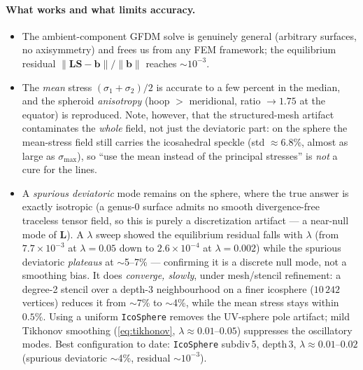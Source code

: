 \documentclass[11pt]{article}
\newcommand{\vv}[1]{\bm{#1}}
\begin{document}
\paragraph{What works and what limits accuracy.}
\begin{itemize}[noitemsep]
  \item The ambient-component GFDM solve is genuinely general (arbitrary surfaces, no
        axisymmetry) and frees us from any FEM framework; the equilibrium residual
        $\|\mathbf L\vv S-\vv b\|/\|\vv b\|$ reaches $\sim\!10^{-3}$.
  \item The \emph{mean} stress $(\sigma_1+\sigma_2)/2$ is accurate to a few percent in the
        median, and the spheroid \emph{anisotropy} (hoop $>$ meridional, ratio $\to1.75$ at
        the equator) is reproduced. Note, however, that the structured-mesh artifact
        contaminates the \emph{whole} field, not just the deviatoric part: on the sphere the
        mean-stress field still carries the icosahedral speckle (std $\approx6.8\%$, almost
        as large as $\sigma_{\max}$), so ``use the mean instead of the principal stresses''
        is \emph{not} a cure for the lines.
  \item A \emph{spurious deviatoric} mode remains on the sphere, where the true answer is
        exactly isotropic (a genus-0 surface admits no smooth divergence-free traceless
        tensor field, so this is purely a discretization artifact --- a near-null mode of
        $\mathbf L$). A $\lambda$ sweep showed the equilibrium residual falls with
        $\lambda$ (from $7.7\times10^{-3}$ at $\lambda{=}0.05$ down to $2.6\times10^{-4}$ at
        $\lambda{=}0.002$) while the spurious deviatoric \emph{plateaus} at $\sim$5--7\% ---
        confirming it is a discrete null mode, not a smoothing bias. It does \emph{converge,
        slowly}, under mesh/stencil refinement: a degree-2 stencil over a depth-3
        neighbourhood on a finer icosphere ($10\,242$ vertices) reduces it from $\sim$7\% to
        $\sim$4\%, while the mean stress stays within $0.5\%$. Using a uniform
        \texttt{IcoSphere} removes the UV-sphere pole artifact; mild Tikhonov smoothing
        (\eqref{eq:tikhonov}, $\lambda\approx0.01$--$0.05$) suppresses the oscillatory modes.
        Best configuration to date: \texttt{IcoSphere} subdiv\,5, depth\,3,
        $\lambda\approx0.01$--$0.02$ (spurious deviatoric $\sim$4\%, residual $\sim10^{-3}$).
\end{itemize}
\end{document}
